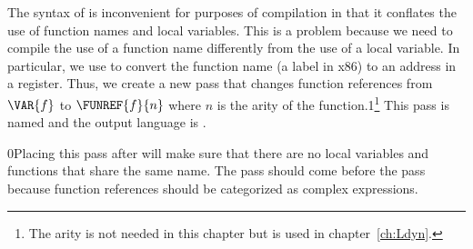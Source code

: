 \documentclass[7x10]{TimesAPriori_MIT}%
\newcommand{\gray}[1]{{\color{gray} #1}}
\def\racketEd{0}
\def\pythonEd{1}
\providecommand{\BookEdition}{1}
\let\edition\BookEdition
\newcommand{\racket}[1]{{\if\edition\racketEd{#1}\fi}}
\newcommand{\pythonColor}[0]{}
\newcommand{\python}[1]{{\if\edition\pythonEd\pythonColor #1\fi}}
\numberwithin{theorem}{chapter}
\numberwithin{definition}{chapter}
\numberwithin{equation}{chapter}
\begin{document}
The syntax of \LangFun{} is inconvenient for purposes of compilation
in that it conflates the use of function names and local
variables. This is a problem because we need to compile the use of a
function name differently from the use of a local variable.  In
particular, we use  to convert the function name (a label
in x86) to an address in a register.  Thus, we create a new pass that
changes function references from $\VAR{f}$ to $\FUNREF{f}{n}$ where
$n$ is the arity of the function.\python{\footnote{The arity is not
    needed in this chapter but is used in chapter~\ref{ch:Ldyn}.}}
This pass is named  and the output language
is \LangFunRef{}.




\racket{Placing this pass after  will make sure that
  there are no local variables and functions that share the same
  name.}
%
The  pass should come before the
 pass because function references
should be categorized as complex expressions.
\end{document}
